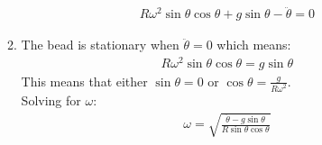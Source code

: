 \documentclass[12pt]{article}
\begin{document}
\begin{enumerate}
\begin{enumerate}
\begin{gather*}
        R\omega^2\sin\theta\cos\theta+g\sin\theta-\ddot{\theta}=0
      \end{gather*}
      \item The bead is stationary when $\ddot{\theta}=0$ which means:
      \begin{gather*}
        R\omega^2\sin\theta\cos\theta=g\sin\theta
      \end{gather*}
      This means that either $\sin\theta=0$ or $\cos\theta=\frac{g}{R\omega^2}$.\\
      Solving for $\omega$:
      \begin{gather*}
        \omega=\sqrt{\frac{\ddot{\theta}-g\sin\theta}{R\sin\theta\cos\theta}}
      \end{gather*}
    \end{enumerate}
  \end{enumerate}
\end{document}

